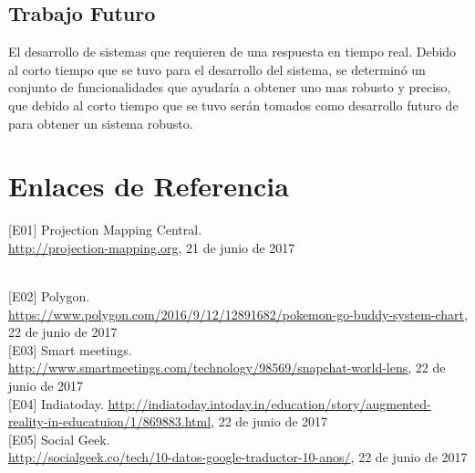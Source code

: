 \documentclass[a4paper,openright,12pt]{report}
\begin{document}
\section{Trabajo Futuro}
El desarrollo de sistemas que requieren de una respuesta en tiempo real.
Debido al corto tiempo que se tuvo para el desarrollo del sistema,  se determinó un conjunto de funcionalidades que ayudaría a obtener uno mas robusto y preciso, que debido al corto tiempo que se tuvo serán tomados como desarrollo futuro de para obtener un sistema robusto.

\cleardoublepage
{}


\chapter*{Enlaces de Referencia}
\hypertarget{e01}{
[E01] Projection Mapping Central. \\\url{http://projection-mapping.org}, 21 de junio de 2017}\\

\hypertarget{e02}{[E02] Polygon. \\\url{https://www.polygon.com/2016/9/12/12891682/pokemon-go-buddy-system-chart}, 22 de junio de 2017}\\

\hypertarget{e03}{[E03] Smart meetings. \url{http://www.smartmeetings.com/technology/98569/snapchat-world-lens}, 22 de junio de 2017}\\

\hypertarget{e04}{[E04] Indiatoday. \url{http://indiatoday.intoday.in/education/story/augmented-reality-in-educatuion/1/869883.html}, 22 de junio de 2017}\\

\hypertarget{e05}{[E05] Social Geek.\\ \url{http://socialgeek.co/tech/10-datos-google-traductor-10-anos/}, 22 de junio de 2017}\\
\end{document}
